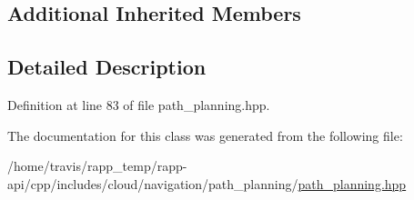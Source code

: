 \subsection*{Additional Inherited Members}


\subsection{Detailed Description}


Definition at line 83 of file path\-\_\-planning.\-hpp.



The documentation for this class was generated from the following file\-:\begin{DoxyCompactItemize}
\item 
/home/travis/rapp\-\_\-temp/rapp-\/api/cpp/includes/cloud/navigation/path\-\_\-planning/\hyperlink{path__planning_8hpp}{path\-\_\-planning.\-hpp}\end{DoxyCompactItemize}
